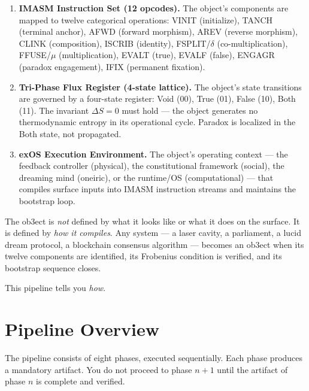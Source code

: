 \documentclass[12pt,a4paper]{article}
\begin{document}
\begin{enumerate}[label=\textbf{Layer \arabic*:}, leftmargin=2em]
\item \textbf{IMASM Instruction Set (12 opcodes).} The object's components are mapped
    to twelve categorical operations: VINIT (initialize), TANCH (terminal anchor),
    AFWD (forward morphism), AREV (reverse morphism), CLINK (composition), ISCRIB
    (identity), FSPLIT/$\delta$ (co-multiplication), FFUSE/$\mu$ (multiplication),
    EVALT (true), EVALF (false), ENGAGR (paradox engagement), IFIX (permanent fixation).

\item \textbf{Tri-Phase Flux Register (4-state lattice).} The object's state transitions
    are governed by a four-state register: Void (00), True (01), False (10), Both (11).
    The invariant $\Delta S = 0$ must hold — the object generates no thermodynamic
    entropy in its operational cycle. Paradox is localized in the Both state, not
    propagated.

\item \textbf{exOS Execution Environment.} The object's operating context — the feedback
    controller (physical), the constitutional framework (social), the dreaming mind
    (oneiric), or the runtime/OS (computational) — that compiles surface inputs into
    IMASM instruction streams and maintains the bootstrap loop.
\end{enumerate}

The ob3ect is \emph{not} defined by what it looks like or what it does on the surface.
It is defined by \emph{how it compiles}. Any system — a laser cavity, a parliament,
a lucid dream protocol, a blockchain consensus algorithm — becomes an ob3ect when its
twelve components are identified, its Frobenius condition is verified, and its bootstrap
sequence closes.

This pipeline tells you \emph{how}.

\section{Pipeline Overview}

The pipeline consists of eight phases, executed sequentially. Each phase produces
a mandatory artifact. You do not proceed to phase $n+1$ until the artifact of phase $n$
is complete and verified.
\end{document}
